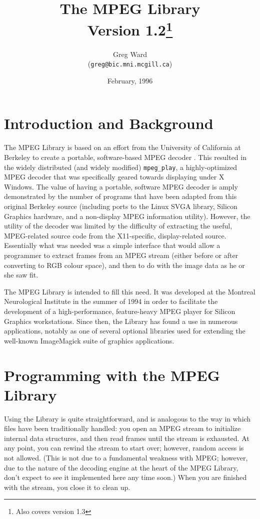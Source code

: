 \documentclass[11pt]{article}
\title{The MPEG Library\\
       Version 1.2\footnote{Also covers version 1.3}}
\author{Greg Ward\\({\tt greg@bic.mni.mcgill.ca})}
\date{February, 1996}
\newcommand{\code}[1]{\texttt{#1}}
\begin{document}
\maketitle

\tableofcontents

\section{Introduction and Background}

The MPEG Library is based on an effort from the University of
California at Berkeley to create a portable, software-based MPEG
decoder  \cite{Patel93}.  This resulted in the widely distributed (and
widely modified) \code{mpeg\_play}, a highly-optimized MPEG decoder
that was specifically geared towards displaying under X Windows.  The
value of having a portable, software MPEG decoder is amply
demonstrated by the number of programs that have been adapted from
this original Berkeley source (including ports to the Linux SVGA
library, Silicon Graphics hardware, and a non-display MPEG information
utility).  However, the utility of the decoder was limited by the
difficulty of extracting the useful, MPEG-related source code from the
X11-specific, display-related source.  Essentially what was needed was
a simple interface that would allow a programmer to extract frames
from an MPEG stream (either before or after converting to RGB colour
space), and then to do with the image data as he or she saw fit.

The MPEG Library is intended to fill this need.  It was developed at
the Montreal Neurological Institute in the summer of 1994 in order to
facilitate the development of a high-performance, feature-heavy
MPEG player for Silicon Graphics workstations.  Since then, the
Library has found a use in numerous applications, notably as one of
several optional libraries used for extending the well-known
ImageMagick suite of graphics applications.

\section{Programming with the MPEG Library}

Using the Library is quite straightforward, and is analogous to the
way in which files have been traditionally handled: you open an MPEG
stream to initialize internal data structures, and then read frames
until the stream is exhausted.  At any point, you can rewind the
stream to start over; however, random access is not allowed.  (This is
not due to a fundamental weakness with MPEG; however, due to the
nature of the decoding engine at the heart of the MPEG Library, don't
expect to see it implemented here any time soon.)  When you are
finished with the stream, you close it to clean up.
\end{document}
